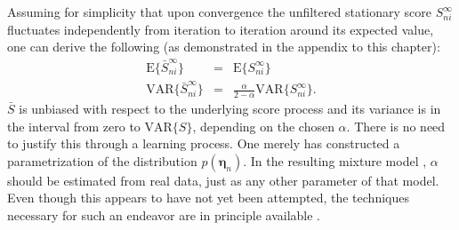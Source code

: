 Assuming for simplicity that upon convergence the unfiltered stationary score
$S_{ni}^{\infty}$ fluctuates independently from iteration to
iteration around its expected value, one can derive the following 
(as demonstrated in the appendix to this chapter):
\begin{eqnarray}
\text{E}\{\bar{S}_{ni}^{\infty}\} & = & \text{E}\{S_{ni}^{\infty}\}\\
\text{VAR}\{\bar{S}_{ni}^{\infty}\} & = & \frac{\alpha}{2-\alpha}\text{VAR}\{S_{ni}^{\infty}\}.
\end{eqnarray}
$\bar{S}$ is unbiased with respect to the underlying score process
and its variance is in the interval from zero to $\text{VAR}\{S\}$,
depending on the chosen $\alpha$. There is no need to justify this
through a learning process. One merely has constructed a parametrization
of the distribution $p(\boldsymbol{\eta}_n)$. In the resulting
mixture model , $\alpha$ should be
estimated from real data, just as any other parameter of that model.
Even though this appears to have not yet been attempted, the techniques
necessary for such an endeavor are in principle available
\citep{gourioux-1993}.
%
%




